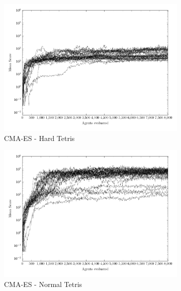 \clearpage

\begin{figure}
	\centering
	\captionsetup[subfigure]{justification=centering}
    \begin{subfigure}[b]{0.49\textwidth}
    	\caption{CMA-ES - Hard Tetris}
        \includegraphics[width=\textwidth]{data/complexity/cma_hard/PlotFile.pdf}
    \end{subfigure} 
    \begin{subfigure}[b]{0.49\textwidth}
    	\caption{CMA-ES - Normal Tetris}
        \includegraphics[width=\textwidth]{data/complexity/cma_normal/PlotFile.pdf}
    \end{subfigure}
    \begin{subfigure}[b]{0.49\textwidth}

\end{subfigure}
\end{figure}
